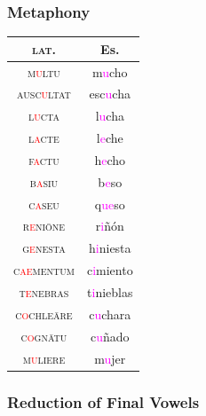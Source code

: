 \documentclass{report}[12pt]
\begin{document}
\subsubsection*{Metaphony}

\begin{tcolorbox}
  
\end{tcolorbox}

\begin{tabular}{c c}
  \textsc{lat.} & Es. \\
  \hline
  \textsc{m\textcolor{red}{u}ltu} & m\textcolor{magenta}{u}cho \\
  \textsc{ausc\textcolor{red}{u}ltat} & esc\textcolor{magenta}{u}cha \\
  \textsc{l\textcolor{red}{u}cta} & l\textcolor{magenta}{u}cha \\
  \textsc{l\textcolor{red}{a}cte} & l\textcolor{magenta}{e}che \\
  \textsc{f\textcolor{red}{a}ctu} & h\textcolor{magenta}{e}cho \\
  \textsc{b\textcolor{red}{a}siu} & b\textcolor{magenta}{e}so \\
  \textsc{c\textcolor{red}{a}seu} & q\textcolor{magenta}{ue}so \\
  \textsc{r\textcolor{red}{e}ni\={o}ne} & r\textcolor{magenta}{i}ñón \\
  \textsc{g\textcolor{red}{e}nesta} & h\textcolor{magenta}{i}niesta \\
  \textsc{c\textcolor{red}{ae}mentum} & c\textcolor{magenta}{i}miento \\
  \textsc{t\textcolor{red}{e}nebras} & t\textcolor{magenta}{i}nieblas \\
  \textsc{c\textcolor{red}{o}chle\={a}re} & c\textcolor{magenta}{u}chara \\
  \textsc{c\textcolor{red}{o}gn\={a}tu} & c\textcolor{magenta}{u}ñado \\
  \textsc{m\textcolor{red}{u}liere} & m\textcolor{magenta}ujer \\
\end{tabular}

\subsubsection*{Reduction of Final Vowels}

\begin{tcolorbox}

\end{tcolorbox}
\end{document}
